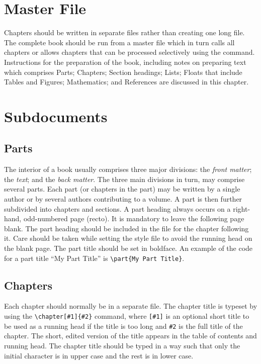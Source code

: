 \section{Master File}
Chapters should be written in separate files rather than creating
one long file. The complete book should be run from a master
file which in turn calls all chapters or allows
chapters that can be processed selectively using the \verb||
command. Instructions for the preparation of the book, including
notes on preparing text which comprises Parts; Chapters; Section
headings; Lists; Floats that include Tables and Figures;
Mathematics; and References are discussed in this chapter.

\section{Subdocuments}
\subsection{Parts}
The interior of a book usually comprises three major divisions: the
{\it front matter}; the {\it text}; and the {\it back matter}. The
three main divisions in turn, may comprise several parts. Each part
(or chapters in the part) may be written by a single author or by
several authors contributing to a volume. A part is then further
subdivided into chapters and sections. A part heading always occurs
on a right-hand, odd-numbered page (recto). It is mandatory to leave
the following page blank. The part heading should be included in the
file for the chapter following it. Care should be taken while
setting the style file to avoid the running head on the blank page.
The part title should be set in boldface. An example of the code for
a part title ``My Part Title'' is \verb|\part{My Part Title}|.

\subsection{Chapters}
Each chapter should normally be in a separate file. The chapter
title is typeset by using the \verb|\chapter[#1]{#2}| command, where
\verb|[#1]| is an optional short title to be used as a running head
if the title is too long and \verb|#2| is the full title of the
chapter. The short, edited version of the title appears in the table
of contents and running head. The chapter title should be typed in a
way such that only the initial character is in upper case and the
rest is in lower case.

